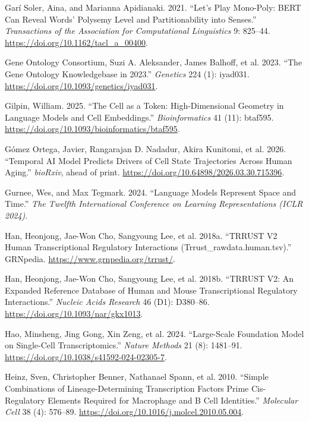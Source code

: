 \documentclass[
  11pt,
]{article}
\newlength{\cslhangindent}
\newenvironment{CSLReferences}[2] %
 {\begin{list}{}{%
  \setlength{\itemindent}{0pt}
  \setlength{\leftmargin}{0pt}
  \setlength{\parsep}{0pt}
  \ifodd #1
   \setlength{\leftmargin}{\cslhangindent}
   \setlength{\itemindent}{-1\cslhangindent}
  \fi
  \setlength{\itemsep}{#2\baselineskip}}}
 {\end{list}}
\begin{document}
\begin{CSLReferences}{1}{1}
Garí Soler, Aina, and Marianna Apidianaki. 2021. {``Let's Play
Mono-Poly: {BERT} Can Reveal Words' Polysemy Level and Partitionability
into Senses.''} \emph{Transactions of the Association for Computational
Linguistics} 9: 825--44. \url{https://doi.org/10.1162/tacl_a_00400}.

{Gene Ontology Consortium, Suzi A. Aleksander, James Balhoff, et al.}
2023. {``The {Gene Ontology} Knowledgebase in 2023.''} \emph{Genetics}
224 (1): iyad031. \url{https://doi.org/10.1093/genetics/iyad031}.

Gilpin, William. 2025. {``The Cell as a Token: High-Dimensional Geometry
in Language Models and Cell Embeddings.''} \emph{Bioinformatics} 41
(11): btaf595. \url{https://doi.org/10.1093/bioinformatics/btaf595}.

{Gómez Ortega, Javier, Rangarajan D. Nadadur, Akira Kunitomi, et al.}
2026. {``Temporal {AI} Model Predicts Drivers of Cell State Trajectories
Across Human Aging.''} \emph{bioRxiv}, ahead of print.
\url{https://doi.org/10.64898/2026.03.30.715396}.

Gurnee, Wes, and Max Tegmark. 2024. {``Language Models Represent Space
and Time.''} \emph{{The Twelfth International Conference on Learning
Representations (ICLR 2024)}}.

{Han, Heonjong, Jae-Won Cho, Sangyoung Lee, et al.} 2018a. {``{TRRUST}
V2 Human Transcriptional Regulatory Interactions
(Trrust\_rawdata.human.tsv).''} GRNpedia.
\url{https://www.grnpedia.org/trrust/}.

{Han, Heonjong, Jae-Won Cho, Sangyoung Lee, et al.} 2018b. {``{TRRUST}
V2: An Expanded Reference Database of Human and Mouse Transcriptional
Regulatory Interactions.''} \emph{Nucleic Acids Research} 46 (D1):
D380--86. \url{https://doi.org/10.1093/nar/gkx1013}.

Hao, Minsheng, Jing Gong, Xin Zeng, et al. 2024. {``Large-Scale
Foundation Model on Single-Cell Transcriptomics.''} \emph{Nature
Methods} 21 (8): 1481--91.
\url{https://doi.org/10.1038/s41592-024-02305-7}.

Heinz, Sven, Christopher Benner, Nathanael Spann, et al. 2010. {``Simple
Combinations of Lineage-Determining Transcription Factors Prime
Cis-Regulatory Elements Required for Macrophage and {B} Cell
Identities.''} \emph{Molecular Cell} 38 (4): 576--89.
\url{https://doi.org/10.1016/j.molcel.2010.05.004}.


\end{CSLReferences}
\end{document}
